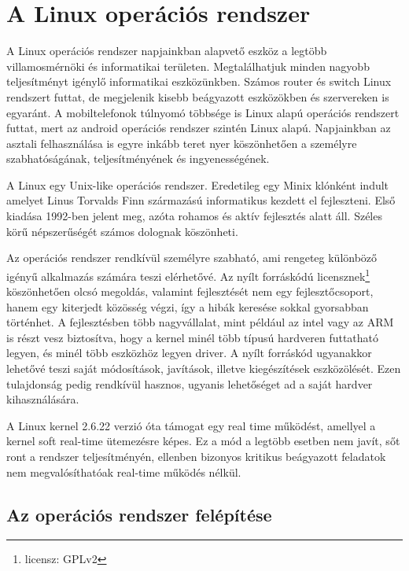 \chapter{A Linux operációs rendszer}

A Linux operációs rendszer napjainkban alapvető eszköz a legtöbb villamosmérnöki
és informatikai területen. Megtalálhatjuk minden nagyobb teljesítményt igénylő
informatikai eszközünkben. Számos router és switch Linux rendszert futtat, de
megjelenik kisebb beágyazott eszközökben és szervereken is egyaránt. A
mobiltelefonok túlnyomó többsége is Linux alapú operációs rendszert futtat, mert
az android operációs rendszer szintén Linux alapú.  Napjainkban az asztali
felhasználása is egyre inkább teret nyer köszönhetően a személyre
szabhatóságának, teljesítményének és ingyenességének.

A Linux egy Unix-like operációs rendszer. Eredetileg egy Minix klónként indult
amelyet Linus Torvalds Finn származású informatikus kezdett el fejleszteni. Első
kiadása 1992-ben jelent meg, azóta rohamos és aktív fejlesztés alatt áll.  Széles
körű népszerűségét számos dolognak köszönheti.

Az operációs rendszer rendkívül személyre szabható, ami rengeteg különböző igényű
alkalmazás számára teszi elérhetővé. Az nyílt forráskódú
licensznek\footnote{licensz: GPLv2} köszönhetően olcsó megoldás, valamint
fejlesztését nem egy fejlesztőcsoport, hanem egy kiterjedt közösség végzi, így a
hibák keresése sokkal gyorsabban történhet. A fejlesztésben több nagyvállalat,
mint például az intel vagy az ARM is részt vesz biztosítva, hogy a kernel minél
több típusú hardveren futtatható legyen, és minél több eszközhöz legyen driver. A
nyílt forráskód ugyanakkor lehetővé teszi saját módosítások, javítások, illetve
kiegészítések eszközölését. Ezen tulajdonság pedig rendkívül hasznos, ugyanis
lehetőséget ad a saját hardver kihasználására.

A Linux kernel 2.6.22 verzió óta támogat egy real time működést, amellyel a
kernel soft real-time ütemezésre képes. Ez a mód a legtöbb esetben nem javít, sőt
ront a rendszer teljesítményén, ellenben bizonyos kritikus beágyazott feladatok
nem megvalósíthatóak real-time működés nélkül.

\section{Az operációs rendszer felépítése}

